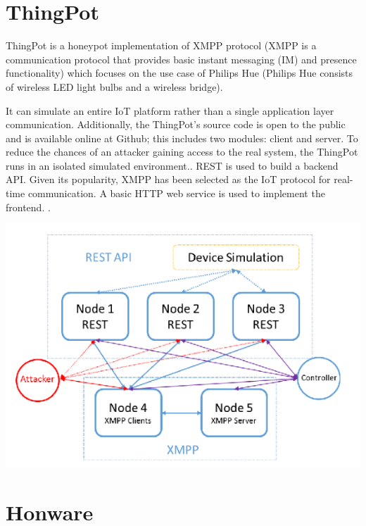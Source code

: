\documentclass[epsfig,a4paper,11pt,titlepage,oneside,openany]{book}
\begin{document}
\begin{itemize}
\section{ThingPot}
ThingPot is a honeypot implementation of XMPP protocol (XMPP is a communication protocol that provides basic instant messaging (IM) and presence functionality) which focuses on the use case of Philips Hue (Philips Hue consists of wireless LED light bulbs and a wireless bridge).

It can simulate an entire IoT platform rather than a single application layer communication. Additionally, the ThingPot’s source code is open to the public and is available online at Github; this includes two modules: client and server. To reduce the chances of an attacker gaining access to the real system, the ThingPot runs in an isolated simulated environment.. REST is used to build a backend API. Given its popularity, XMPP has been selected as the IoT protocol for real-time communication. A basic HTTP web service is used to implement the frontend. \cite{wang2018thingpot}.
\begin{center}
\includegraphics[scale=0.40]{thingpot}
\end{center}


\section{Honware}


\end{itemize}
\end{document}
